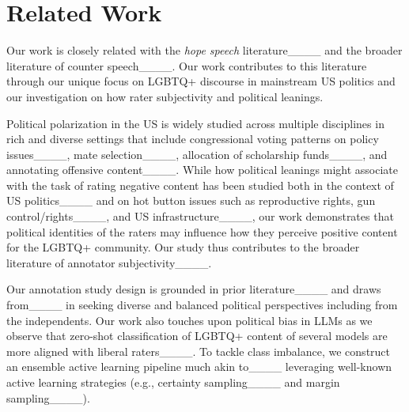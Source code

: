 \section{Related Work}
Our work is closely related with the \textit{hope speech} literature____ and the broader literature of counter speech____. Our work contributes to this literature through our unique focus on LGBTQ+ discourse in mainstream US politics and our investigation on how rater subjectivity and political leanings. 

Political polarization in the US is widely studied across multiple disciplines in rich and diverse settings that include congressional voting patterns on policy issues____, mate selection____, allocation of scholarship funds____, and annotating offensive content____. While how political leanings might associate with the task of rating negative content has been studied both in the context of US politics____ and on hot button issues such as reproductive rights, gun control/rights____, and US infrastructure____, our work demonstrates that political identities of the raters may influence how they perceive positive content for the LGBTQ+ community. Our study thus contributes to the broader literature of annotator subjectivity____. 

Our annotation study design is grounded in prior literature____ and draws from____ in seeking diverse and balanced political perspectives including from the independents. Our work also touches upon political bias in LLMs as we observe that zero-shot classification of LGBTQ+ content of several models are more aligned with liberal raters____. To tackle class imbalance, we construct an ensemble active learning pipeline much akin to____ leveraging well-known active learning strategies (e.g., certainty sampling____ and margin sampling____).  



    
